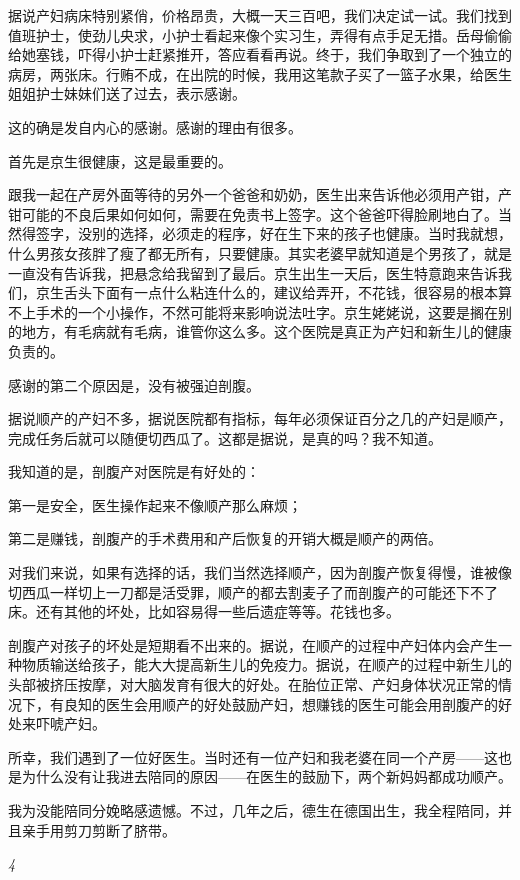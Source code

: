 \documentclass[twoside,openright,headings=optiontohead]{ctexbook} %
\begin{document}
{据说产妇病床特别紧俏，价格昂贵，大概一天三百吧，我们决定试一试。我们找到值班护士，使劲儿央求，小护士看起来像个实习生，弄得有点手足无措。岳母偷偷给她塞钱，吓得小护士赶紧推开，答应看看再说。终于，我们争取到了一个独立的病房，两张床。行贿不成，在出院的时候，我用这笔款子买了一篮子水果，给医生姐姐护士妹妹们送了过去，表示感谢。

这的确是发自内心的感谢。感谢的理由有很多。

首先是京生很健康，这是最重要的。

跟我一起在产房外面等待的另外一个爸爸和奶奶，医生出来告诉他必须用产钳，产钳可能的不良后果如何如何，需要在免责书上签字。这个爸爸吓得脸刷地白了。当然得签字，没别的选择，必须走的程序，好在生下来的孩子也健康。当时我就想，什么男孩女孩胖了瘦了都无所有，只要健康。其实老婆早就知道是个男孩了，就是一直没有告诉我，把悬念给我留到了最后。京生出生一天后，医生特意跑来告诉我们，京生舌头下面有一点什么粘连什么的，建议给弄开，不花钱，很容易的根本算不上手术的一个小操作，不然可能将来影响说法吐字。京生姥姥说，这要是搁在别的地方，有毛病就有毛病，谁管你这么多。这个医院是真正为产妇和新生儿的健康负责的。

感谢的第二个原因是，没有被强迫剖腹。

据说顺产的产妇不多，据说医院都有指标，每年必须保证百分之几的产妇是顺产，完成任务后就可以随便切西瓜了。这都是据说，是真的吗？我不知道。

我知道的是，剖腹产对医院是有好处的：

第一是安全，医生操作起来不像顺产那么麻烦；

第二是赚钱，剖腹产的手术费用和产后恢复的开销大概是顺产的两倍。

对我们来说，如果有选择的话，我们当然选择顺产，因为剖腹产恢复得慢，谁被像切西瓜一样切上一刀都是活受罪，顺产的都去割麦子了而剖腹产的可能还下不了床。还有其他的坏处，比如容易得一些后遗症等等。花钱也多。

剖腹产对孩子的坏处是短期看不出来的。据说，在顺产的过程中产妇体内会产生一种物质输送给孩子，能大大提高新生儿的免疫力。据说，在顺产的过程中新生儿的头部被挤压按摩，对大脑发育有很大的好处。在胎位正常、产妇身体状况正常的情况下，有良知的医生会用顺产的好处鼓励产妇，想赚钱的医生可能会用剖腹产的好处来吓唬产妇。

所幸，我们遇到了一位好医生。当时还有一位产妇和我老婆在同一个产房------这也是为什么没有让我进去陪同的原因------在医生的鼓励下，两个新妈妈都成功顺产。

我为没能陪同分娩略感遗憾。不过，几年之后，德生在德国出生，我全程陪同，并且亲手用剪刀剪断了脐带。

\emph{4}

}
\end{document}
